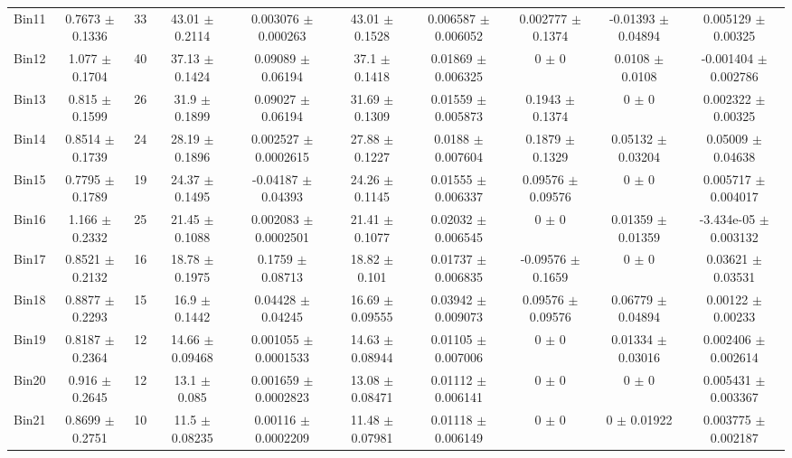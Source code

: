 \begin{tabular}{@{\extracolsep{4pt}}lccccccccc@{}}
     Bin11 & 0.7673 $\pm$ 0.1336 & 33 & 43.01 $\pm$ 0.2114 & 0.003076 $\pm$ 0.000263 & 43.01 $\pm$ 0.1528 & 0.006587 $\pm$ 0.006052 & 0.002777 $\pm$ 0.1374 & -0.01393 $\pm$ 0.04894 & 0.005129 $\pm$ 0.00325 \\ 
     Bin12 & 1.077 $\pm$ 0.1704 & 40 & 37.13 $\pm$ 0.1424 & 0.09089 $\pm$ 0.06194 & 37.1 $\pm$ 0.1418 & 0.01869 $\pm$ 0.006325 & 0 $\pm$ 0 & 0.0108 $\pm$ 0.0108 & -0.001404 $\pm$ 0.002786 \\ 
     Bin13 & 0.815 $\pm$ 0.1599 & 26 & 31.9 $\pm$ 0.1899 & 0.09027 $\pm$ 0.06194 & 31.69 $\pm$ 0.1309 & 0.01559 $\pm$ 0.005873 & 0.1943 $\pm$ 0.1374 & 0 $\pm$ 0 & 0.002322 $\pm$ 0.00325 \\ 
     Bin14 & 0.8514 $\pm$ 0.1739 & 24 & 28.19 $\pm$ 0.1896 & 0.002527 $\pm$ 0.0002615 & 27.88 $\pm$ 0.1227 & 0.0188 $\pm$ 0.007604 & 0.1879 $\pm$ 0.1329 & 0.05132 $\pm$ 0.03204 & 0.05009 $\pm$ 0.04638 \\ 
     Bin15 & 0.7795 $\pm$ 0.1789 & 19 & 24.37 $\pm$ 0.1495 & -0.04187 $\pm$ 0.04393 & 24.26 $\pm$ 0.1145 & 0.01555 $\pm$ 0.006337 & 0.09576 $\pm$ 0.09576 & 0 $\pm$ 0 & 0.005717 $\pm$ 0.004017 \\ 
     Bin16 & 1.166 $\pm$ 0.2332 & 25 & 21.45 $\pm$ 0.1088 & 0.002083 $\pm$ 0.0002501 & 21.41 $\pm$ 0.1077 & 0.02032 $\pm$ 0.006545 & 0 $\pm$ 0 & 0.01359 $\pm$ 0.01359 & -3.434e-05 $\pm$ 0.003132 \\ 
     Bin17 & 0.8521 $\pm$ 0.2132 & 16 & 18.78 $\pm$ 0.1975 & 0.1759 $\pm$ 0.08713 & 18.82 $\pm$ 0.101 & 0.01737 $\pm$ 0.006835 & -0.09576 $\pm$ 0.1659 & 0 $\pm$ 0 & 0.03621 $\pm$ 0.03531 \\ 
     Bin18 & 0.8877 $\pm$ 0.2293 & 15 & 16.9 $\pm$ 0.1442 & 0.04428 $\pm$ 0.04245 & 16.69 $\pm$ 0.09555 & 0.03942 $\pm$ 0.009073 & 0.09576 $\pm$ 0.09576 & 0.06779 $\pm$ 0.04894 & 0.00122 $\pm$ 0.00233 \\ 
     Bin19 & 0.8187 $\pm$ 0.2364 & 12 & 14.66 $\pm$ 0.09468 & 0.001055 $\pm$ 0.0001533 & 14.63 $\pm$ 0.08944 & 0.01105 $\pm$ 0.007006 & 0 $\pm$ 0 & 0.01334 $\pm$ 0.03016 & 0.002406 $\pm$ 0.002614 \\ 
     Bin20 & 0.916 $\pm$ 0.2645 & 12 & 13.1 $\pm$ 0.085 & 0.001659 $\pm$ 0.0002823 & 13.08 $\pm$ 0.08471 & 0.01112 $\pm$ 0.006141 & 0 $\pm$ 0 & 0 $\pm$ 0 & 0.005431 $\pm$ 0.003367 \\ 
     Bin21 & 0.8699 $\pm$ 0.2751 & 10 & 11.5 $\pm$ 0.08235 & 0.00116 $\pm$ 0.0002209 & 11.48 $\pm$ 0.07981 & 0.01118 $\pm$ 0.006149 & 0 $\pm$ 0 & 0 $\pm$ 0.01922 & 0.003775 $\pm$ 0.002187 \\ 

\end{tabular}
